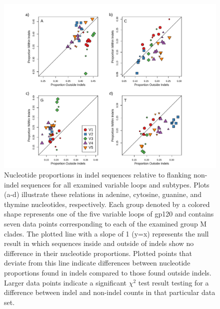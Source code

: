 \documentclass[12pt]{article}
\begin{document}
\begin{figure}
    \centering
    \includegraphics[width=1.05\textwidth,trim={2.85cm 0 2.9cm 0},clip]{nt-plot}
    \caption{ 
    Nucleotide proportions in indel sequences relative to flanking non-indel sequences for all examined variable loops and subtypes. 
    Plots (a-d) illustrate these relations in adenine, cytosine, guanine, and thymine nucleotides, respectively.  
    Each group denoted by a colored shape represents one of the five variable loops of gp120 and contains seven data points corresponding to each of the examined group M clades. 
    The plotted line with a slope of 1 (y=x) represents the null result in which sequences inside and outside of indels show no difference in their nucleotide proportions. 
    Plotted points that deviate from this line indicate differences between nucleotide proportions found in indels compared to those found outside indels. 
    Larger data points indicate a significant $\chi^2$ test result testing for a difference between indel and non-indel counts in that particular data set.
    }
    \label{nt-plot}
\end{figure}
\end{document}
